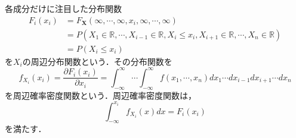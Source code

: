 \documentclass{jsreport}
\begin{document}
各成分だけに注目した分布関数
\begin{align}
  F_i(x_i) &= F_{\bm{X}}(\infty, \cdots, \infty, x_i, \infty, \cdots, \infty) \nonumber \\
   &= P(X_1 \in \mathbb{R}, \cdots, X_{i - 1} \in \mathbb{R}, X_i \leq x_i, X_{i + 1} \in \mathbb{R}, \cdots, X_n \in \mathbb{R}) \nonumber \\
   &= P(X_i \leq x_i) \nonumber
\end{align}
を$X_i$の周辺分布関数という．その分布関数を
\begin{equation}
  f_{X_i}(x_i) = \frac{\partial F_i(x_i)}{\partial x_i} = \int_{-\infty}^{\infty} \cdots \int_{-\infty}^{\infty} f(x_1, \cdots, x_n) dx_1 \cdots dx_{i - 1} dx_{i + 1} \cdots dx_n \nonumber
\end{equation}
を周辺確率密度関数という．周辺確率密度関数は，
\begin{equation}
  \int_{-\infty}^{x_i} f_{X_i}(x) dx = F_i(x_i) \nonumber
\end{equation}
を満たす．
\end{document}

